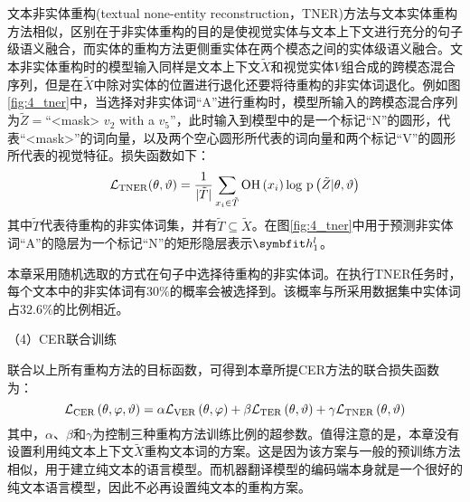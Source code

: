 
文本非实体重构(textual none-entity reconstruction，TNER)方法与文本实体重构方法相似，区别在于非实体重构的目的是使视觉实体与文本上下文进行充分的句子级语义融合，而实体的重构方法更侧重实体在两个模态之间的实体级语义融合。文本非实体重构时的模型输入同样是文本上下文$\tilde{X}$和视觉实体$V$组合成的跨模态混合序列，但是在$\tilde{X}$中除对实体的位置进行退化还要将待重构的非实体词退化。例如图\ref{fig:4_tner}中，当选择对非实体词“A”进行重构时，模型所输入的跨模态混合序列为$\tilde{Z}=$“<mask> $v_2$ with a $v_5$”，此时输入到模型中的是一个标记“N”的圆形，代表“<mask>”的词向量，以及两个空心圆形所代表的词向量和两个标记“V”的圆形所代表的视觉特征。损失函数如下：
\begin{equation}
\mathcal{L}_{\rm{TNER}}(\theta, \vartheta) =
    \frac{1}{{\vert}\tilde{T}{\vert}}
    \mathop{\sum}_{x_i \in \tilde{T}}
    {\rm{OH}} \left( x_i \right)
    {\rm log}{\ }{\rm p} \left( \tilde{Z} {\vert} \theta, \vartheta \right)
\end{equation}
其中$\tilde{T}$代表待重构的非实体词集，并有$\tilde{T}\subseteq \tilde{X}$。在图\ref{fig:4_tner}中用于预测非实体词“A”的隐层为一个标记“N”的矩形隐层表示$\Vector{h_1^l}$。

本章采用随机选取的方式在句子中选择待重构的非实体词。在执行TNER任务时，每个文本中的非实体词有$30\%$的概率会被选择到。该概率与所采用数据集中实体词占$32.6\%$的比例相近。

{\sffamily （4）CER联合训练}

联合以上所有重构方法的目标函数，可得到本章所提CER方法的联合损失函数为：
\begin{equation}
\mathcal{L}_{\rm{CER}} \left( \theta, \varphi, \vartheta \right) = \alpha \mathcal{L}_{\rm{VER}} \left( \theta, \varphi \right) + \beta \mathcal{L}_{\rm{TER}} \left( \theta, \vartheta \right) + \gamma \mathcal{L}_{\rm{TNER}} \left( \theta, \vartheta \right)
\label{eq:4_combined_cer}
\end{equation}
其中，$\alpha$、$\beta$和$\gamma$为控制三种重构方法训练比例的超参数。值得注意的是，本章没有设置利用纯文本上下文$\tilde{X}$重构文本词的方案。这是因为该方案与一般的预训练方法相似，用于建立纯文本的语言模型。而机器翻译模型的编码端本身就是一个很好的纯文本语言模型，因此不必再设置纯文本的重构方案。

